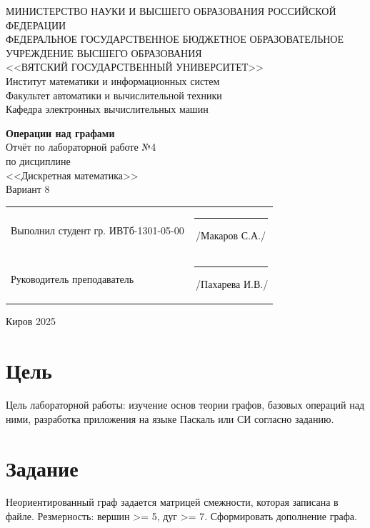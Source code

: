 \documentclass[a4paper,14pt]{extarticle}
\begin{document}
  \newpage\thispagestyle{empty}
  \begin{center}
    \MakeUppercase{
      Министерство науки и высшего образования Российской Федерации\\
      Федеральное государственное бюджетное образовательное учреждение высшего образования\\
      <<Вятский Государственный Университет>>\\
    }
    Институт математики и информационных систем\\
    Факультет автоматики и вычислительной техники\\
    Кафедра электронных вычислительных машин
  \end{center}
  \vfill

  \begin{center}
    \textbf{Операции над графами}\\
    Отчёт по лабораторной работе №4\\
    по дисциплине\\
    <<Дискретная математика>>\\
    Вариант 8
  \end{center}
  \vfill

  \noindent
  \begin{tabular}{ll}
    Выполнил студент гр. ИВТб-1301-05-00 \hspace{5mm} &
    \rule[-1mm]{25mm}{0.10mm}\,/Макаров С.А./\\
    
    Руководитель преподаватель & \rule[-1mm]{25mm}{0.10mm}\,/Пахарева И.В./\\
  \end{tabular}

  \vfill
  \begin{center}
    Киров 2025
  \end{center}

  \newpage
  \section*{\hspace{12.5mm}Цель}
  Цель лабораторной работы: изучение основ теории графов, базовых операций над ними, разработка приложения на языке Паскаль или СИ согласно заданию.

  \section*{\hspace{12.5mm}Задание}
  Неориентированный граф задается матрицей смежности, которая записана в файле. Резмерность: вершин >= 5, дуг >= 7. Сформировать дополнение графа.
\end{document}
